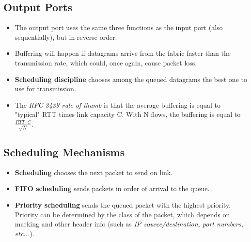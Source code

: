 \documentclass{article}
\begin{document}
\subsection{Output Ports}

\begin{itemize}
\item The output port uses the same three functions as the input port (also sequentially), but in reverse order.
\item Buffering will happen if datagrams arrive from the fabric faster than the transmission rate, which could, once again, cause packet loss.
\item {\bf Scheduling discipline} chooses among the queued datagrams the best one to use for transmission.
\item The \emph{RFC 3439 rule of thumb} is that the average buffering is equal to "typical" RTT times link capacity C. With N flows, the buffering is equal to $\frac{RTT\cdot C}{\sqrt{N}}$.
\end{itemize}

\subsection{Scheduling Mechanisms}

\begin{itemize}
\item {\bf Scheduling} chooses the next packet to send on link.
\item {\bf FIFO scheduling} sends packets in order of arrival to the queue.
\item {\bf Priority scheduling} sends the queued packet with the highest priority. Priority can be determined by the class of the packet, which depends on marking and other header info (such as \emph{IP source/destination, port numbers, etc...}).
\end{itemize}
\end{document}
